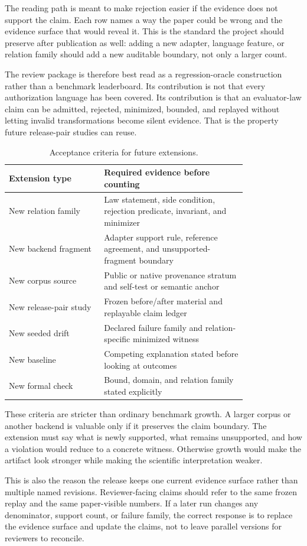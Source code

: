 \documentclass[10pt,conference]{IEEEtran}
\begin{document}
The reading path is meant to make rejection easier if the evidence does not support the claim.  Each row names a way the paper could be wrong and the evidence surface that would reveal it.  This is the standard the project should preserve after publication as well: adding a new adapter, language feature, or relation family should add a new auditable boundary, not only a larger count.

The review package is therefore best read as a regression-oracle construction rather than a benchmark leaderboard.  Its contribution is not that every authorization language has been covered.  Its contribution is that an evaluator-law claim can be admitted, rejected, minimized, bounded, and replayed without letting invalid transformations become silent evidence.  That is the property future release-pair studies can reuse.

\begin{table}[t]
\centering
\caption{Acceptance criteria for future extensions.}
\label{tab:extensioncriteria}
\begin{tabular}{p{0.32\linewidth}p{0.48\linewidth}}
\toprule
Extension type & Required evidence before counting \\
\midrule
New relation family & Law statement, side condition, rejection predicate, invariant, and minimizer \\
New backend fragment & Adapter support rule, reference agreement, and unsupported-fragment boundary \\
New corpus source & Public or native provenance stratum and self-test or semantic anchor \\
New release-pair study & Frozen before/after material and replayable claim ledger \\
New seeded drift & Declared failure family and relation-specific minimized witness \\
New baseline & Competing explanation stated before looking at outcomes \\
New formal check & Bound, domain, and relation family stated explicitly \\
\bottomrule
\end{tabular}
\end{table}

These criteria are stricter than ordinary benchmark growth.  A larger corpus or another backend is valuable only if it preserves the claim boundary.  The extension must say what is newly supported, what remains unsupported, and how a violation would reduce to a concrete witness.  Otherwise growth would make the artifact look stronger while making the scientific interpretation weaker.

This is also the reason the release keeps one current evidence surface rather than multiple named revisions.  Reviewer-facing claims should refer to the same frozen replay and the same paper-visible numbers.  If a later run changes any denominator, support count, or failure family, the correct response is to replace the evidence surface and update the claims, not to leave parallel versions for reviewers to reconcile.
\end{document}
